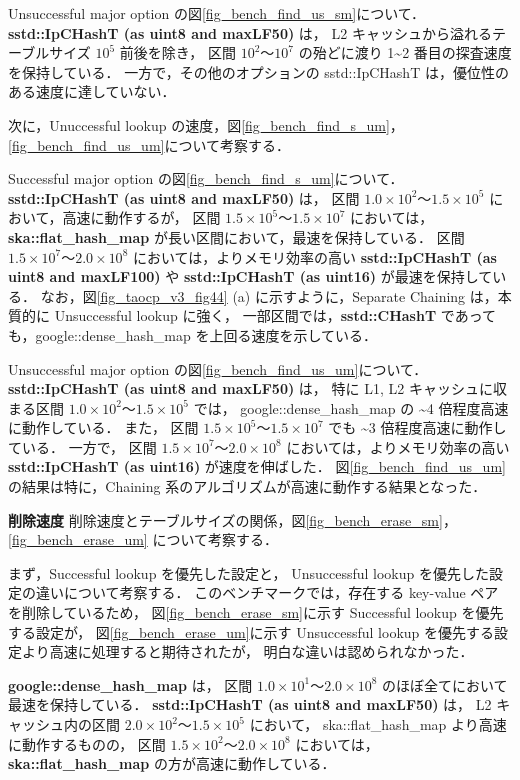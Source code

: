 Unsuccessful major option の図\ref{fig_bench_find_us_sm}について．
{\bf sstd::IpCHashT (as uint8 and maxLF50)} は，
L2 キャッシュから溢れるテーブルサイズ $10^5$ 前後を除き，
区間 $10^2〜10^7$ の殆どに渡り 1\textasciitilde 2 番目の探査速度を保持している．
一方で，その他のオプションの sstd::IpCHashT は，優位性のある速度に達していない．

次に，Unuccessful lookup の速度，図\ref{fig_bench_find_s_um}，\ref{fig_bench_find_us_um}について考察する．

Successful major option の図\ref{fig_bench_find_s_um}について．
{\bf sstd::IpCHashT (as uint8 and maxLF50)} は，
区間 $1.0\times10^2〜1.5\times10^5$ において，高速に動作するが，
区間 $1.5\times10^5〜1.5\times10^7$ においては，{\bf ska::flat\_hash\_map} が長い区間において，最速を保持している．
区間 $1.5\times10^7〜2.0\times10^8$ においては，よりメモリ効率の高い
{\bf sstd::IpCHashT (as uint8 and maxLF100)} や {\bf sstd::IpCHashT (as uint16)} が最速を保持している．
なお，図\ref{fig_taocp_v3_fig44} (a) に示すように，Separate Chaining は，本質的に Unsuccessful lookup に強く，
一部区間では，{\bf sstd::CHashT} であっても，google::dense\_hash\_map を上回る速度を示している．

Unsuccessful major option の図\ref{fig_bench_find_us_um}について．
{\bf sstd::IpCHashT (as uint8 and maxLF50)} は，
特に L1, L2 キャッシュに収まる区間 $1.0\times10^2〜1.5\times10^5$ では，
google::dense\_hash\_map の \textasciitilde4 倍程度高速に動作している．
また，
区間 $1.5\times10^5〜1.5\times10^7$ でも \textasciitilde3 倍程度高速に動作している．
一方で，
区間 $1.5\times10^7〜2.0\times10^8$ においては，よりメモリ効率の高い {\bf sstd::IpCHashT (as uint16)} が速度を伸ばした．
図\ref{fig_bench_find_us_um}の結果は特に，Chaining 系のアルゴリズムが高速に動作する結果となった．
\leavevmode \newline

%
{\bf 削除速度}
\samepage\newline\indent
削除速度とテーブルサイズの関係，図\ref{fig_bench_erase_sm}，\ref{fig_bench_erase_um} について考察する．

まず，Successful lookup を優先した設定と，
Unsuccessful lookup を優先した設定の違いについて考察する．
このベンチマークでは，存在する key-value ペアを削除しているため，
図\ref{fig_bench_erase_sm}に示す Successful lookup を優先する設定が，
図\ref{fig_bench_erase_um}に示す Unsuccessful lookup を優先する設定より高速に処理すると期待されたが，
明白な違いは認められなかった．

{\bf google::dense\_hash\_map} は，
区間 $1.0\times10^1〜2.0\times10^8$ のほぼ全てにおいて最速を保持している．
{\bf sstd::IpCHashT (as uint8 and maxLF50)} は，
L2 キャッシュ内の区間 $2.0\times10^2〜1.5\times10^5$ において，
ska::flat\_hash\_map より高速に動作するものの，
区間 $1.5\times10^2〜2.0\times10^8$ においては，
{\bf ska::flat\_hash\_map} の方が高速に動作している．


